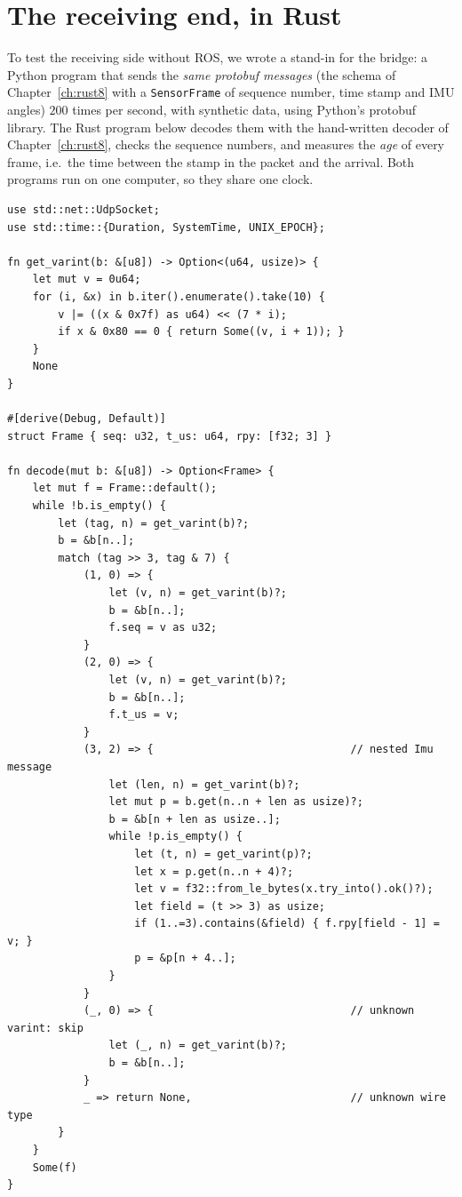 \section*{The receiving end, in Rust}
To test the receiving side without ROS, we wrote a stand-in for the bridge: a Python program that sends the \emph{same protobuf messages} (the schema of Chapter~\ref{ch:rust8} with a \verb!SensorFrame! of sequence number, time stamp and IMU angles) $200$ times per second, with synthetic data, using Python's protobuf library. The Rust program below decodes them with the hand-written decoder of Chapter~\ref{ch:rust8}, checks the sequence numbers, and measures the \emph{age} of every frame, i.e.\ the time between the stamp in the packet and the arrival. Both programs run on one computer, so they share one clock.
\begin{verbatim}
use std::net::UdpSocket;
use std::time::{Duration, SystemTime, UNIX_EPOCH};

fn get_varint(b: &[u8]) -> Option<(u64, usize)> {
    let mut v = 0u64;
    for (i, &x) in b.iter().enumerate().take(10) {
        v |= ((x & 0x7f) as u64) << (7 * i);
        if x & 0x80 == 0 { return Some((v, i + 1)); }
    }
    None
}

#[derive(Debug, Default)]
struct Frame { seq: u32, t_us: u64, rpy: [f32; 3] }

fn decode(mut b: &[u8]) -> Option<Frame> {
    let mut f = Frame::default();
    while !b.is_empty() {
        let (tag, n) = get_varint(b)?;
        b = &b[n..];
        match (tag >> 3, tag & 7) {
            (1, 0) => {
                let (v, n) = get_varint(b)?;
                b = &b[n..];
                f.seq = v as u32;
            }
            (2, 0) => {
                let (v, n) = get_varint(b)?;
                b = &b[n..];
                f.t_us = v;
            }
            (3, 2) => {                               // nested Imu message
                let (len, n) = get_varint(b)?;
                let mut p = b.get(n..n + len as usize)?;
                b = &b[n + len as usize..];
                while !p.is_empty() {
                    let (t, n) = get_varint(p)?;
                    let x = p.get(n..n + 4)?;
                    let v = f32::from_le_bytes(x.try_into().ok()?);
                    let field = (t >> 3) as usize;
                    if (1..=3).contains(&field) { f.rpy[field - 1] = v; }
                    p = &p[n + 4..];
                }
            }
            (_, 0) => {                               // unknown varint: skip
                let (_, n) = get_varint(b)?;
                b = &b[n..];
            }
            _ => return None,                         // unknown wire type
        }
    }
    Some(f)
}


\end{verbatim}

